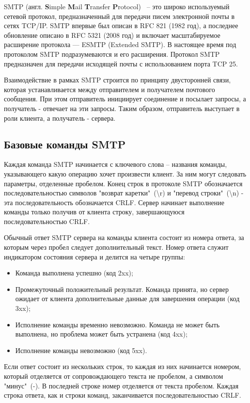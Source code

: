 \documentclass[a4paper,12pt]{report}
\begin{document}
SMTP (англ. \textbf{S}imple \textbf{M}ail \textbf{T}ransfer \textbf{P}rotocol) ~-- это широко используемый сетевой протокол, предназначенный для передачи писем электронной почты в сетях TCP/IP. SMTP впервые был описан в RFC 821 (1982 год), а последнее обновление описано в RFC 5321 (2008 год) и включает масштабируемое расширение протокола — ESMTP (Extended SMTP). В настоящее время под протоколом SMTP подразумеваются и его расширения. Протокол SMTP предназначен для передачи исходящей почты с использованием порта TCP 25.

Взаимодействие в рамках SMTP строится по принципу двусторонней связи, которая устанавливается между отправителем и получателем почтового сообщения. При этом отправитель инициирует соединение и посылает запросы, а получатель - отвечает на эти запросы. Таким образом, отправитель выступает в роли клиента, а получатель - сервера.


\subsection{Базовые команды SMTP}

Каждая команда SMTP начинается с ключевого слова – названия команды, указывающего какую операцию хочет произвести клиент. За ним могут следовать параметры, отделенные пробелом. Конец строк в протоколе SMTP обозначается последовательностью символов "возврат каретки"\ (\textbackslash r) и "перевод строки"\ (\textbackslash n) - эта последовательность обозначается CRLF. Сервер начинает выполнение команды только получив от клиента строку, завершающуюся последовательностью CRLF. 

Обычный ответ SMTP сервера на команды клиента состоит из номера ответа, за которым через пробел следует дополнительный текст. Номер ответа служит индикатором состояния сервера и делится на четыре группы:
\begin{itemize}
    \item Команда выполнена успешно (код 2xx);
    \item Промежуточный положительный результат. Команда принята, но сервер ожидает от клиента дополнительные данные для завершения операции (код 3xx);
    \item Исполнение команды временно невозможно. Команда не может быть выполнена, но проблема может быть устранена (код 4xx);
    \item Исполнение команды невозможно (код 5xx).
\end{itemize}

Если ответ состоит из нескольких строк, то каждая из них начинается номером, который отделяется от сопровождающего текста не пробелом, а символом "минус"\ (-). В последней строке номер отделяется от текста пробелом. Каждая строка ответа, как и строки команд, заканчивается последовательностью CRLF.
\end{document}

